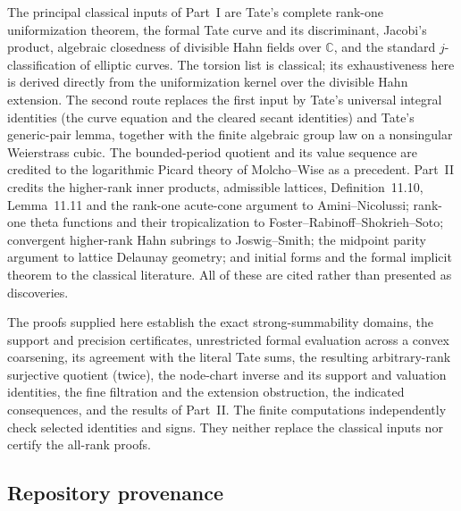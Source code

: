 \documentclass[11pt,letterpaper]{article}
\theoremstyle{definition}
\newcommand{\C}{\mathbb C}
\begin{document}
The principal classical inputs of Part~I are Tate's complete rank-one
uniformization theorem, the formal Tate curve and its discriminant,
Jacobi's product, algebraic closedness of divisible Hahn fields over
$\C$, and the standard $j$-classification of elliptic curves.
The torsion list is classical; its exhaustiveness here is derived directly
from the uniformization kernel over the divisible Hahn extension. The second route replaces the first input by Tate's universal
integral identities (the curve equation and the cleared secant identities)
and Tate's generic-pair lemma, together with the finite algebraic group law
on a nonsingular Weierstrass cubic. The bounded-period quotient and its
value sequence are credited to the logarithmic Picard theory of
Molcho--Wise as a precedent. Part~II credits the higher-rank inner products,
admissible lattices, Definition~11.10, Lemma~11.11 and the rank-one acute-cone
argument to Amini--Nicolussi; rank-one theta functions and their
tropicalization to Foster--Rabinoff--Shokrieh--Soto; convergent higher-rank
Hahn subrings to Joswig--Smith; the midpoint parity argument to lattice
Delaunay geometry; and initial forms and the formal implicit theorem to the
classical literature. All of these are cited rather than presented as
discoveries.

The proofs supplied here establish the exact strong-summability domains,
the support and precision certificates, unrestricted formal evaluation
across a convex coarsening, its agreement with the literal Tate sums,
the resulting arbitrary-rank surjective quotient (twice), the node-chart
inverse and its support and valuation identities, the fine filtration and
the extension obstruction, the indicated consequences, and the results of
Part~II. The finite computations independently check selected identities
and signs. They neither replace the classical inputs nor certify the
all-rank proofs.

\subsection{Repository provenance}
\end{document}
